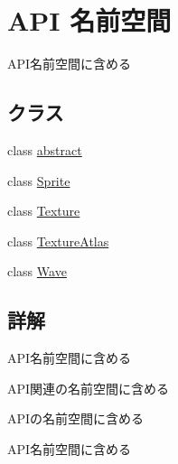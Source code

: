 \hypertarget{namespace_a_p_i}{}\section{A\+PI 名前空間}
\label{namespace_a_p_i}


A\+P\+I名前空間に含める  


\subsection*{クラス}
\begin{DoxyCompactItemize}
\item 
class \hyperlink{class_a_p_i_1_1abstract}{abstract}
\item 
class \hyperlink{class_a_p_i_1_1_sprite}{Sprite}
\item 
class \hyperlink{class_a_p_i_1_1_texture}{Texture}
\item 
class \hyperlink{class_a_p_i_1_1_texture_atlas}{Texture\+Atlas}
\item 
class \hyperlink{class_a_p_i_1_1_wave}{Wave}
\end{DoxyCompactItemize}


\subsection{詳解}
A\+P\+I名前空間に含める 

A\+P\+I関連の名前空間に含める

A\+P\+Iの名前空間に含める

A\+P\+I名前空間に含める 
